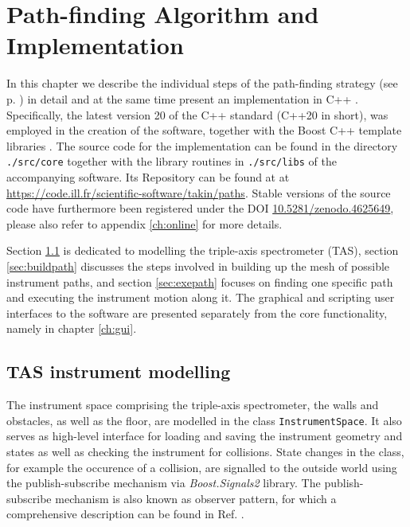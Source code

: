 %
%

\chapter{Path-finding Algorithm and Implementation}
\label{ch:impl}

In this chapter we describe the individual steps of the path-finding strategy (see p. \pageref{sec:strategy}) 
in detail and at the same time present an implementation in C++ \cite{Stroustrup2008, Stroustrup2018}. 
Specifically, the latest version 20 of the C++ standard \cite{ISOCPP20} (C++20 in short),
was employed in the creation of the software, together with the Boost C++ template libraries \cite{web_boost}. 
The source code for the implementation can be found in the directory \lstinline|./src/core| 
together with the library routines in \lstinline|./src/libs| of the accompanying software.
Its Repository can be found at at \url{https://code.ill.fr/scientific-software/takin/paths}. 
Stable versions of the source code have furthermore been registered under the DOI 
\href{https://doi.org/10.5281/zenodo.4625649}{10.5281/zenodo.4625649}, please also refer to 
appendix \ref{ch:online} for more details.

Section \ref{sec:tasmodel} is dedicated to modelling the triple-axis spectrometer (TAS), 
section \ref{sec:buildpath} discusses the steps involved in building up the mesh of possible instrument paths, 
and section \ref{sec:exepath} focuses on finding one specific path and executing the instrument motion along it.
The graphical and scripting user interfaces to the software are presented separately from the core functionality, 
namely in chapter \ref{ch:gui}.




\section{TAS instrument modelling}
\label{sec:tasmodel}

The instrument space comprising the triple-axis spectrometer, the walls and obstacles, as well as the floor, are modelled in
the class \lstinline[language=C++]|InstrumentSpace|. It also serves as high-level interface for loading and saving
the instrument geometry and states as well as checking the instrument for collisions. 
State changes in the class, for example the occurence of a collision, are signalled to the outside world using the 
publish-subscribe mechanism via \textit{Boost.Signals2} \cite{web_boost_signals} library.
The publish-subscribe mechanism is also known as observer pattern, for which a comprehensive description 
can be found in Ref. \cite[Ch. 4, pp. 122-127]{FUH_prog2019}.

